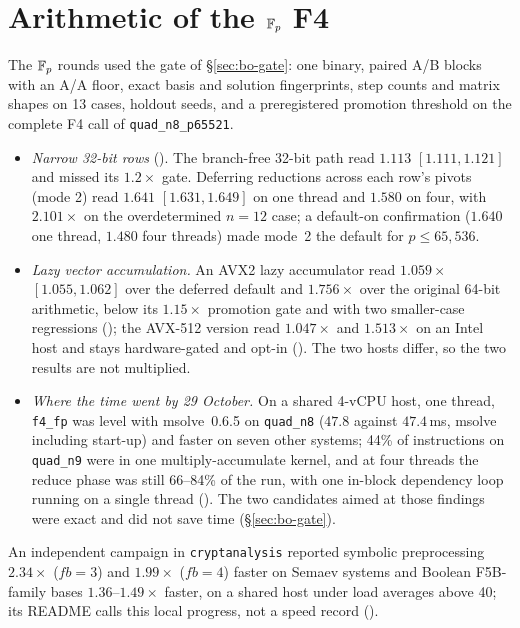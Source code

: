 \section{Arithmetic of the $\mathbb{F}_p$ F4}\label{sec:fe-arith}

The $\mathbb{F}_p$ rounds used the gate of \S\ref{sec:bo-gate}: one binary, paired
A/B blocks with an A/A floor, exact basis and solution fingerprints, step
counts and matrix shapes on 13 cases, holdout seeds, and a preregistered
promotion threshold on the complete F4 call of \texttt{quad\_n8\_p65521}.
\begin{itemize}
\item \emph{Narrow 32-bit rows} ().
  The branch-free 32-bit path read $1.113$ $[1.111,1.121]$ and missed its
  $1.2\times$ gate. Deferring reductions across each row's pivots (mode 2)
  read $1.641$ $[1.631,1.649]$ on one thread and $1.580$ on four, with
  $2.101\times$ on the overdetermined $n=12$ case; a default-on confirmation
  ($1.640$ one thread, $1.480$ four threads) made mode~2 the default for
  $p\le65{,}536$.
\item \emph{Lazy vector accumulation.} An AVX2 lazy accumulator read
  $1.059\times$ $[1.055,1.062]$ over the deferred default and $1.756\times$
  over the original 64-bit arithmetic, below its $1.15\times$ promotion gate
  and with two smaller-case regressions
  (); the AVX-512 version
  read $1.047\times$ and $1.513\times$ on an Intel host and stays
  hardware-gated and opt-in
  (). The two hosts
  differ, so the two results are not multiplied.
\item \emph{Where the time went by 29 October.} On a shared 4-vCPU host,
  one thread, \texttt{f4\_fp} was level with msolve~0.6.5 on
  \texttt{quad\_n8} ($47.8$ against $47.4$\,ms, msolve including start-up)
  and faster on seven other systems; 44\% of instructions on
  \texttt{quad\_n9} were in one multiply-accumulate kernel, and at four
  threads the reduce phase was still 66--84\% of the run, with one
  in-block dependency loop running on a single thread
  (). The two candidates
  aimed at those findings were exact and did not save time
  (\S\ref{sec:bo-gate}).
\end{itemize}
An independent campaign in \texttt{cryptanalysis} reported symbolic
preprocessing $2.34\times$ ($fb=3$) and $1.99\times$ ($fb=4$) faster on Semaev
systems and Boolean F5B-family bases $1.36$--$1.49\times$ faster, on a shared
host under load averages above 40; its README calls this local progress,
not a speed record ().

